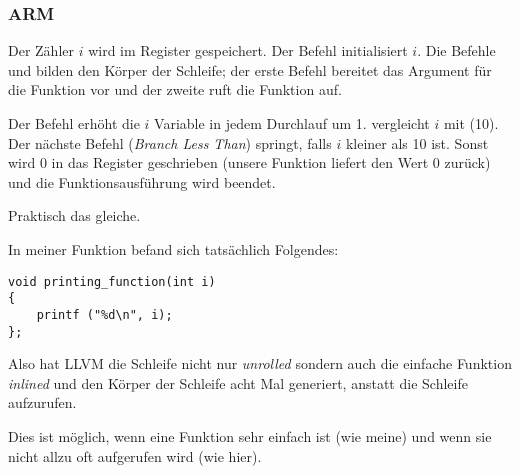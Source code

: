 \subsubsection{ARM}

\myparagraph{\NonOptimizingKeilVI (\ARMMode)}



Der Zähler $i$ wird im Register  gespeichert. 
Der Befehl  initialisiert $i$.
Die Befehle  und  bilden den Körper
der Schleife; der erste Befehl bereitet das Argument für die \ttf Funktion vor
und der zweite ruft die Funktion auf.

Der Befehl  erhöht die $i$ Variable in jedem Durchlauf um
1.
 vergleicht $i$ mit  (10). 
Der nächste Befehl  (\emph{Branch Less Than}) springt, falls $i$ kleiner
als 10 ist. Sonst wird 0 in das Register  geschrieben (unsere Funktion
liefert den Wert 0 zurück) und die Funktionsausführung wird beendet.

\myparagraph{\OptimizingKeilVI (\ThumbMode)}



Praktisch das gleiche.

\myparagraph{\OptimizingXcodeIV (\ThumbTwoMode)}
\label{ARM_unrolled_loops}



In meiner \ttf Funktion befand sich tatsächlich Folgendes:

\begin{lstlisting}[style=customc]
void printing_function(int i)
{
    printf ("%d\n", i);
};
\end{lstlisting}

Also hat LLVM die Schleife nicht nur \emph{unrolled} sondern auch die einfache
Funktion \ttf \emph{inlined} und den Körper der Schleife acht Mal generiert,
anstatt die Schleife aufzurufen. 

Dies ist möglich, wenn eine Funktion sehr einfach ist (wie meine) und wenn sie
nicht allzu oft aufgerufen wird (wie hier).








